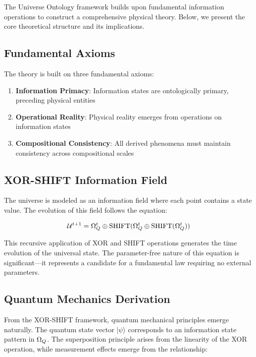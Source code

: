 The Universe Ontology framework builds upon fundamental information operations to construct a comprehensive physical theory. Below, we present the core theoretical structure and its implications.

\subsection{Fundamental Axioms}

The theory is built on three fundamental axioms:

\begin{enumerate}
    \item \textbf{Information Primacy}: Information states are ontologically primary, preceding physical entities
    \item \textbf{Operational Reality}: Physical reality emerges from operations on information states
    \item \textbf{Compositional Consistency}: All derived phenomena must maintain consistency across compositional scales
\end{enumerate}

\subsection{XOR-SHIFT Information Field}

The universe is modeled as an information field where each point contains a state value. The evolution of this field follows the equation:

\begin{equation}
\mathcal{U}^{t+1} = \Omega_Q^t \oplus \text{SHIFT}(\Omega_Q^t \oplus \text{SHIFT}(\Omega_Q^t))
\end{equation}

This recursive application of XOR and SHIFT operations generates the time evolution of the universal state. The parameter-free nature of this equation is significant—it represents a candidate for a fundamental law requiring no external parameters.

\subsection{Quantum Mechanics Derivation}

From the XOR-SHIFT framework, quantum mechanical principles emerge naturally. The quantum state vector $|\psi\rangle$ corresponds to an information state pattern in $\Omega_Q$. The superposition principle arises from the linearity of the XOR operation, while measurement effects emerge from the relationship:

